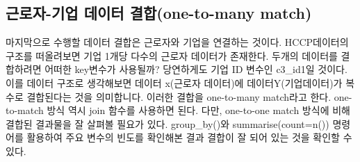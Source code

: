 \documentclass[
]{book}
\theoremstyle{definition}
\theoremstyle{definition}
\theoremstyle{definition}
\theoremstyle{definition}
\theoremstyle{remark}
\begin{document}
\hypertarget{uxadfcuxb85cuxc790-uxae30uxc5c5-uxb370uxc774uxd130-uxacb0uxd569one-to-many-match}{%
\subsection{근로자-기업 데이터 결합(one-to-many match)}\label{uxadfcuxb85cuxc790-uxae30uxc5c5-uxb370uxc774uxd130-uxacb0uxd569one-to-many-match}}

마지막으로 수행할 데이터 결합은 근로자와 기업을 연결하는 것이다. HCCP데이터의 구조를 떠올려보면 기업 1개당 다수의 근로자 데이터가 존재한다. 두개의 데이터를 결합하려면 어떠한 key변수가 사용될까? 당연하게도 기업 ID 변수인 c3\_id1일 것이다. 이를 데이터 구조로 생각해보면 데이터 x(근로자 데이터)에 데이터Y(기업데이터)가 복수로 결합된다는 것을 의미합니다. 이러한 결합을 one-to-many match라고 한다. one-to-match 방식 역시 join 함수를 사용하면 된다. 다만, one-to-one match 방식에 비해 결합된 결과물을 잘 살펴볼 필요가 있다. group\_by()와 summarise(count=n()) 명령어를 활용하여 주요 변수의 빈도를 확인해본 결과 결합이 잘 되어 있는 것을 확인할 수 있다.
\end{document}
